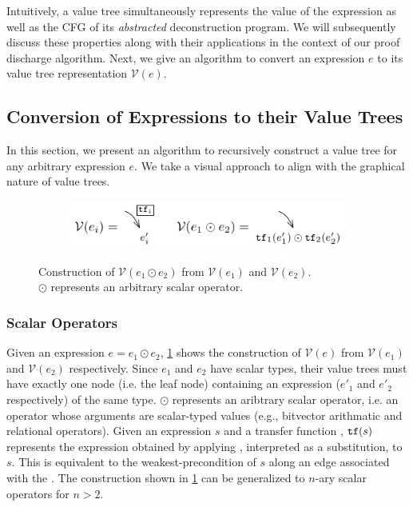 Intuitively, a value tree simultaneously represents the value of the expression as well as
the CFG of its {\em abstracted} deconstruction program.
We will subsequently discuss these properties along with their applications in the context
of our proof discharge algorithm.
Next, we give an algorithm to convert an expression $e$ to its value tree representation $\mathcal{V}(e)$.

\subsection{Conversion of Expressions to their Value Trees}
\label{sec:valuetreeconv}
In this section, we present an algorithm to recursively construct a value tree for any arbitrary expression $e$.
We take a visual approach to align with the graphical nature of value trees.

\begin{figure}[H]
\begin{subfigure}[b]{\textwidth}
\begin{center}
\includegraphics[scale=1.3]{chapters/figures/figValueTreeConvScalar.pdf}
\end{center}
\end{subfigure}
\caption{\label{fig:valuetreeconvscalar} Construction of $\mathcal{V}(e_1 \odot e_2)$ from $\mathcal{V}(e_1)$ and $\mathcal{V}(e_2)$.\\
$\odot$ represents an arbitrary scalar operator.}
\end{figure}

\subsubsection{Scalar Operators}
Given an expression $e = e_1 \odot e_2$,
\cref{fig:valuetreeconvscalar} shows the construction of $\mathcal{V}(e)$
from $\mathcal{V}(e_1)$ and $\mathcal{V}(e_2)$ respectively.
Since $e_1$ and $e_2$ have scalar types, their value trees must have exactly one
node (i.e. the leaf node) containing an expression ($e'_1$ and $e'_2$ respectively) of the same type.
$\odot$ represents an aribtrary scalar operator, i.e. an operator whose arguments
are scalar-typed values (e.g., bitvector arithmatic and relational operators).
Given an expression $s$ and a transfer function \xfer{}, ${\tt tf}{}(s)$
represents the expression obtained by applying \xfer{}, interpreted as a substitution,
to $s$. This is equivalent to the weakest-precondition of $s$ along an edge associated
with the \xfer{}.
The construction shown in \cref{fig:valuetreeconvscalar} can be generalized to
$n$-ary scalar operators for $n>2$.

